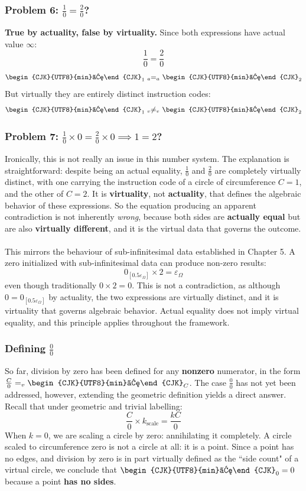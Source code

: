 \documentclass{article}
\newcommand{\U}{\begin{CJK}{UTF8}{min}ウ\end{CJK}}
\begin{document}
\subsubsection*{Problem 6: $\frac{1}{0} = \frac{2}{0}$?}

\textbf{True by actuality, false by virtuality.} Since both expressions 
have actual value $\infty$:
$$\frac{1}{0} = \frac{2}{0}$$
$$\text{\U}_1 \ _a{=}{}_a \ \text{\U}_2$$
But virtually they are entirely distinct instruction codes:
$$\text{\U}_1 \ {}_v{\neq}{}_v \ \text{\U}_2$$

\subsubsection*{Problem 7: $\frac{1}{0} \times 0 = \frac{2}{0} \times 0 \implies1=2$?}

Ironically, this is not really an issue in this number system. The 
explanation is straightforward: despite being an actual equality, 
$\frac{1}{0}$ and $\frac{2}{0}$ are completely virtually distinct, with  
one carrying the instruction code of a circle of circumference $C = 1$, and  
the other of $C = 2$. It is \textbf{virtuality}, not \textbf{actuality}, 
that defines the algebraic behavior of these expressions. So the 
equation producing an apparent contradiction is not inherently \textit{wrong}, because
both sides are \textbf{actually equal} but are also \textbf{virtually different}, 
and it is the virtual data that governs the outcome.
\\\\This mirrors the behaviour of sub-infinitesimal data established in 
Chapter 5. A zero initialized with sub-infinitesimal data can produce 
non-zero results:
$$0_{[0.5\varepsilon_\Omega]} \times 2 = \varepsilon_\Omega$$
even though traditionally $0 \times 2 = 0$. This is not a contradiction, as although $0 = 0_{[0.5\varepsilon_\Omega]}$ by actuality, the two 
expressions are virtually distinct, and it is virtuality that governs algebraic
behavior. Actual equality does not imply virtual equality, and this 
principle applies throughout the framework.

\subsubsection{Defining $\frac{0}{0}$}

So far, division by zero has been defined for any \textbf{nonzero} 
numerator, in the form $\frac{C}{0} =_v \text{\U}_C$. The case 
$\frac{0}{0}$ has not yet been addressed, however, extending the geometric definition yields a direct answer. Recall 
that under geometric and trivial labelling:
$$\frac{C}{0} \times k_{\text{scale}} = \frac{kC}{0}$$
When $k = 0$, we are scaling a circle by zero: annihilating it 
completely. A circle scaled to circumference zero is not a circle at 
all: it is a point. Since a point has no edges, and division by zero 
is in part virtually defined as the ``side count" of a virtual circle, we conclude that $\text{\U}_0 = 0$ because a point \textbf{has no sides}.
\end{document}
